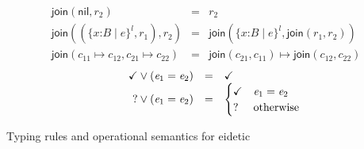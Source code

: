 \documentclass[9pt]{extarticle}
\newcommand{\ottnt}[1]{\mathit{#1}}
\newcommand{\ottsym}[1]{#1}
\begin{document}
\begin{bigfigure}
{\[\begin{array}{rcl}
     \mathsf{join} ( \mathsf{nil} , \ottnt{r_{{\mathrm{2}}}} )  &=& \ottnt{r_{{\mathrm{2}}}} \\
     \mathsf{join} ( \ottsym{(}    \{ \mathit{x} \mathord{:} \ottnt{B} \mathrel{\mid} \ottnt{e} \}^{ \ottnt{l} }  , \ottnt{r_{{\mathrm{1}}}}   \ottsym{)} , \ottnt{r_{{\mathrm{2}}}} )  &=&  \mathsf{join} (  \{ \mathit{x} \mathord{:} \ottnt{B} \mathrel{\mid} \ottnt{e} \}^{ \ottnt{l} }  ,  \mathsf{join} ( \ottnt{r_{{\mathrm{1}}}} , \ottnt{r_{{\mathrm{2}}}} )  )  \\
     \mathsf{join} ( \ottnt{c_{{\mathrm{11}}}}  \mapsto  \ottnt{c_{{\mathrm{12}}}} , \ottnt{c_{{\mathrm{21}}}}  \mapsto  \ottnt{c_{{\mathrm{22}}}} )  &=&  \mathsf{join} ( \ottnt{c_{{\mathrm{21}}}} , \ottnt{c_{{\mathrm{11}}}} )   \mapsto   \mathsf{join} ( \ottnt{c_{{\mathrm{12}}}} , \ottnt{c_{{\mathrm{22}}}} ) 
  \end{array} \]}
\sidebyside[.7][.26][t]
  {\[ \begin{array}{rcl}
    \mathsf{drop} \, \ottsym{(}  \mathsf{nil}  \ottsym{,}   \{ \mathit{x} \mathord{:} \ottnt{B} \mathrel{\mid} \ottnt{e} \}   \ottsym{)} &=&  \mathsf{nil}  \\
    \mathsf{drop} \, \ottsym{(}  \ottsym{(}    \{ \mathit{x} \mathord{:} \ottnt{B} \mathrel{\mid} \ottnt{e_{{\mathrm{1}}}} \}^{ \ottnt{l} }  , \ottnt{r}   \ottsym{)}  \ottsym{,}   \{ \mathit{x} \mathord{:} \ottnt{B} \mathrel{\mid} \ottnt{e} \}   \ottsym{)} &=& \begin{cases}
      \mathsf{drop} \, \ottsym{(}  \ottnt{r}  \ottsym{,}   \{ \mathit{x} \mathord{:} \ottnt{B} \mathrel{\mid} \ottnt{e} \}   \ottsym{)} &  \{ \mathit{x} \mathord{:} \ottnt{B} \mathrel{\mid} \ottnt{e} \}  \, \supset \,  \{ \mathit{x} \mathord{:} \ottnt{B} \mathrel{\mid} \ottnt{e_{{\mathrm{1}}}} \}  \\
        \{ \mathit{x} \mathord{:} \ottnt{B} \mathrel{\mid} \ottnt{e_{{\mathrm{1}}}} \}^{ \ottnt{l} }  , \mathsf{drop} \, \ottsym{(}  \ottnt{r}  \ottsym{,}   \{ \mathit{x} \mathord{:} \ottnt{B} \mathrel{\mid} \ottnt{e} \}   \ottsym{)}  &  \{ \mathit{x} \mathord{:} \ottnt{B} \mathrel{\mid} \ottnt{e} \}  \, \not \supset \,  \{ \mathit{x} \mathord{:} \ottnt{B} \mathrel{\mid} \ottnt{e_{{\mathrm{1}}}} \} 
    \end{cases}
  \end{array} \]}
  {\[ \begin{array}{@{\qquad}rcl}
      \mathord{\checkmark}   \vee ( \ottnt{e_{{\mathrm{1}}}}  =  \ottnt{e_{{\mathrm{2}}}} )  &=&  \mathord{\checkmark}  \\
      \mathord{?}   \vee ( \ottnt{e_{{\mathrm{1}}}}  =  \ottnt{e_{{\mathrm{2}}}} )  &=& \begin{cases}
       \mathord{\checkmark}  & \ottnt{e_{{\mathrm{1}}}}  \ottsym{=}  \ottnt{e_{{\mathrm{2}}}} \\
       \mathord{?}  & \text{otherwise}
    \end{cases}
  \end{array} \]}
  \vspace*{-10pt}
  \caption{Typing rules and operational semantics for eidetic \lambdah}
  \label{fig:eideticsemantics}
\end{bigfigure}
\end{document}
